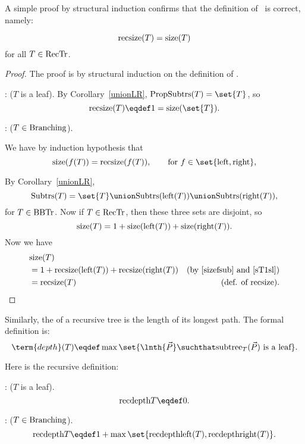A simple proof by structural induction confirms that the definition of
\trsize{}\ is correct, namely:
\begin{lemma}\label{}
\[
\text{recsize}(T) = \text{size}(T)
\]
for all $T \in \text{RecTr}$.

\begin{proof}
The proof is by structural induction on the definition of \rectr.

: ($T$ is a leaf).
By Corollary~\ref{unionLR}, $\propbrn{T} = \set{T}$, so
\[
\trsize{(T)} \eqdef 1 = \text{size}(\set{T}).
\]

: ($T \in\text{Branching}$).

We have by induction hypothesis that
\begin{equation}\label{sizefsub}
\text{size}(f(T)) = \trsize{(f(T))}, \qquad  \text{for}\ f \in \set{\leftsub{}, \rightsub{}},
\end{equation}

By Corollary~\ref{unionLR},
\[
\subbrn{T} = \set{T} \union \subbrn{\leftsub{(T)}} \union \subbrn{\rightsub{(T)}},
\]
for $T \in \text{BBTr}$.  Now if $T \in \text{RecTr}$, then these three sets are disjoint, so
\begin{equation}\label{sT1sl}
\text{size}(T) = 1 + \text{size}(\text{left}(T)) + \text{size}(\text{right}(T)).
\end{equation}
Now we have
\begin{align*}
\lefteqn{\text{size}(T)}\\
 & = 1 + \trsize{(\leftsub{(T)})} + \trsize{(\rightsub{(T)})}
   & \text{(by~\eqref{sizefsub} and~\eqref{sT1sl})}\\
 & = \trsize{(T)} 
   & \text{(def. of \trsize{})}.
\end{align*}
\end{proof}
\end{lemma}

Similarly, the  of a recursive tree is the length of its
longest path.  The formal definition is:
\begin{equation}\label{defdepth}
\term{depth}(T) \eqdef \max \set{\lnth{\vec{P}} \suchthat
  \rslt{T}{(\vec{P})}\ \text{is a leaf}}.
\end{equation}

Here is the recursive definition:
\begin{definition}
: ($T$ is a leaf).
\[
\trdpth{T} \eqdef 0.
\]

: ($T \in\text{Branching}$).
\[
\trdpth{T} \eqdef 1+\max\set{\trdpth{\leftsub{(T)}}, \trdpth{\rightsub{(T)}}}.
\]
\end{definition}

